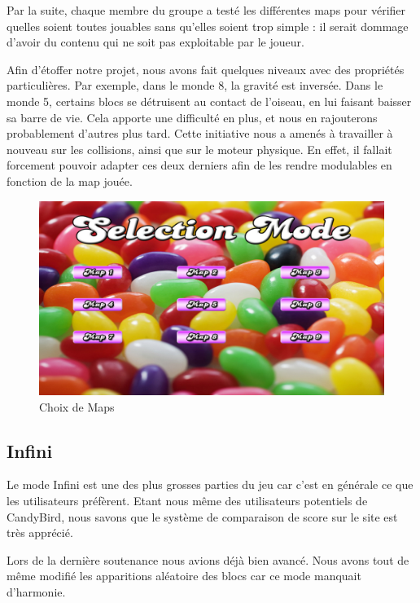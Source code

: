\documentclass [11pt]{report}
\begin{document}
			Par la suite, chaque membre du groupe a testé les différentes maps pour vérifier quelles soient toutes jouables sans qu'elles soient trop simple : il serait dommage d'avoir du contenu qui ne soit pas exploitable par le joueur.\\
			
			
			\newpage
			
			\indent Afin d'étoffer notre projet, nous avons fait quelques niveaux avec des propriétés particulières. Par exemple, dans le monde 8, la gravité est inversée. Dans le monde 5, certains blocs se détruisent au contact de l'oiseau, en lui faisant baisser sa barre de vie. Cela apporte une difficulté en plus, et nous en rajouterons probablement d'autres plus tard. Cette initiative nous a amenés à travailler à nouveau sur les collisions, ainsi que sur le moteur physique. En effet, il fallait forcement pouvoir adapter ces deux derniers afin de les rendre modulables en fonction de la map jouée.	
					
			\vspace{6mm}				
			\begin{figure}[h]
				\centering
				\includegraphics[width=0.7\linewidth]{images/map_menu.png}
				\caption[Map Menu]{Choix de Maps}				
				\label{fig:Map Menu}
			\end{figure}
			\vspace{10mm}
			
		\subsection{Infini}
			Le mode Infini est une des plus grosses parties du jeu car c'est en générale ce que les utilisateurs préfèrent. Etant nous même des utilisateurs potentiels de CandyBird, nous savons que le système de comparaison de score sur le site est très apprécié.
						
			Lors de la dernière soutenance nous avions déjà bien avancé. Nous avons tout de même modifié les apparitions aléatoire des blocs car ce mode manquait d'harmonie.\\
						
\end{document}
